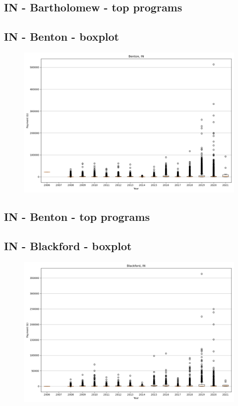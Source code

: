 \subsection*{IN - Bartholomew - top programs}

\newpage
\subsection*{IN - Benton - boxplot}
\begin{figure}[h]
\centering
\includegraphics[width=7in]{../output/boxplots/counties/Benton-IN_boxplot.png}
\end{figure}


\subsection*{IN - Benton - top programs}

\newpage
\subsection*{IN - Blackford - boxplot}
\begin{figure}[h]
\centering
\includegraphics[width=7in]{../output/boxplots/counties/Blackford-IN_boxplot.png}
\end{figure}


